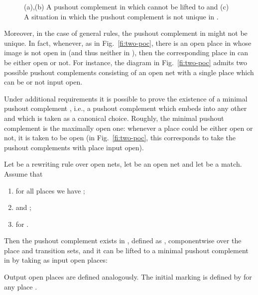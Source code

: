 \documentclass{LMCS}
\begin{document}
\begin{figure}[t]
  \centering
  \hspace{5mm}
  \hspace{5mm}

\caption{(a),(b) A pushout complement in  which cannot be lifted to
   and (c) A situation in which the pushout complement is not
  unique in .}

\end{figure}

Moreover, in the case of general rules, the pushout complement in
 might not be unique. In fact, whenever, as in
Fig.~\ref{fi:two-poc}, there is an open place in  whose image is
not open in  (and thus neither in ), then the corresponding
place in  can be either open or not. For instance, the diagram in
Fig.~\ref{fi:two-poc} admits two possible pushout complements
consisting of an open net  with a single place  which can be or
not input open.

Under additional requirements it is possible to prove the existence of
a minimal pushout complement , i.e., a pushout complement which
embeds into any other and which is taken as a canonical
choice. Roughly, the minimal pushout complement is the maximally open
one: whenever a place could be either open or not, it is taken to be
open (in Fig.~\ref{fi:two-poc}, this corresponds to take the pushout
complements  with place  input open).



\begin{lem}
  \label{le:po-complement}
  Let  be a rewriting rule over open nets, let  be an open net and let
   be a match. Assume that
  \begin{enumerate}[\em(1)]

  \item for all places  we have ;

  \item
      
    and ;

  \item  for .


  \end{enumerate}
  Then the pushout complement exists in , defined as , componentwise over the place and transition
  sets, and it can be lifted to a minimal pushout complement in
   by taking as input open places:
  \begin{center}
     
  \end{center}
  Output open places are defined analogously.
  The initial marking  is defined by  for any place
  .
\end{lem}
\end{document}
